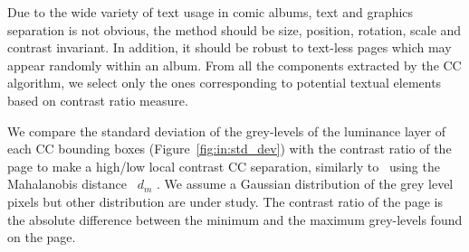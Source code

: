 
Due to the wide variety of text usage in comic albums, text and graphics separation is not obvious, the method should be size, position, rotation, scale and contrast invariant.
In addition, it should be robust to text-less pages which may appear randomly within an album.
From all the components extracted by the CC algorithm, we select only the ones corresponding to potential textual elements based on contrast ratio measure.




We compare the standard deviation of the grey-levels of the luminance layer of each CC bounding boxes (Figure~\ref{fig:in:std_dev}) with the contrast ratio of the page to make a high/low local contrast CC separation, similarly to~\cite{Li2013Unsupervised} using the Mahalanobis distance~\cite{mahalanobis1936generalized,de2000mahalanobis} $d_m$ .
We assume a Gaussian distribution of the grey level pixels but other distribution are under study.
The contrast ratio of the page is the absolute difference between the minimum and the maximum grey-levels found on the page.


